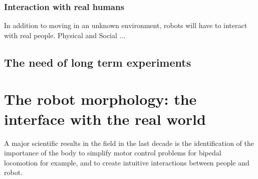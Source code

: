 \subsubsection{Interaction with real humans} %
In addition to moving in an unknown environment, robots will have to interact with real people.
Physical and Social ...


\subsection{The need of long term experiments} %


\section{The robot morphology: the interface with the real world} %

A major scientific results in the field in the last decade is the identification of the importance of the body to simplify motor control problems for bipedal locomotion for example, and to create intuitive interactions between people and robot.

